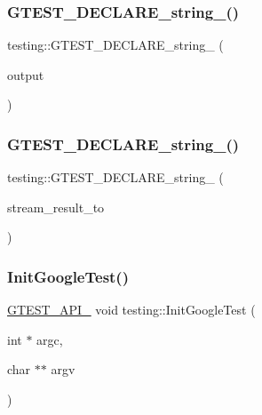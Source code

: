 \mbox{\label{namespacetesting_a3fe54dd551f1c36cfdd1b36cd6881a44}} 
\subsubsection{\texorpdfstring{GTEST\_DECLARE\_string\_()}{GTEST\_DECLARE\_string\_()}\hspace{0.1cm}{\footnotesize\ttfamily [4/5]}}
{\footnotesize\ttfamily testing\+::\+G\+T\+E\+S\+T\+\_\+\+D\+E\+C\+L\+A\+R\+E\+\_\+string\+\_\+ (\begin{DoxyParamCaption}\item[{output}]{ }\end{DoxyParamCaption})}

\mbox{\label{namespacetesting_ad4d1ea63037fc21018dbe997cb0041d1}} 
\subsubsection{\texorpdfstring{GTEST\_DECLARE\_string\_()}{GTEST\_DECLARE\_string\_()}\hspace{0.1cm}{\footnotesize\ttfamily [5/5]}}
{\footnotesize\ttfamily testing\+::\+G\+T\+E\+S\+T\+\_\+\+D\+E\+C\+L\+A\+R\+E\+\_\+string\+\_\+ (\begin{DoxyParamCaption}\item[{stream\+\_\+result\+\_\+to}]{ }\end{DoxyParamCaption})}

\mbox{\label{namespacetesting_aee3f6f99df893f576f705f66c0559482}} 
\subsubsection{\texorpdfstring{InitGoogleTest()}{InitGoogleTest()}\hspace{0.1cm}{\footnotesize\ttfamily [1/2]}}
{\footnotesize\ttfamily \mbox{\hyperlink{gtest-port_8h_aa73be6f0ba4a7456180a94904ce17790}{G\+T\+E\+S\+T\+\_\+\+A\+P\+I\+\_\+}} void testing\+::\+Init\+Google\+Test (\begin{DoxyParamCaption}\item[{int $\ast$}]{argc,  }\item[{char $\ast$$\ast$}]{argv }\end{DoxyParamCaption})}


